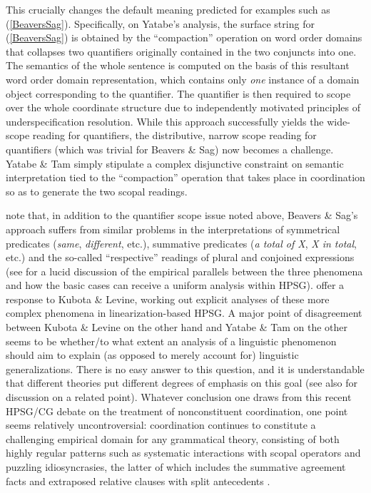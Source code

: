 \documentclass[output=paper
                ,modfonts
 	        ,biblatex
                ,babelshorthands
                ,newtxmath
                ,draftmode
                ,colorlinks, citecolor=brown
]{langscibook}
\begin{document}
This crucially changes the default meaning predicted for examples such
as (\ref{BeaversSag}). Specifically, on Yatabe's analysis, the surface
string for (\ref{BeaversSag}) is obtained by the ``compaction''
operation on word order domains that collapses two quantifiers
originally contained in the two conjuncts into one. The semantics of
the whole sentence is computed on the basis of this resultant word
order domain representation, which contains only \emph{one} instance
of a domain object corresponding to the quantifier. The quantifier is
then required to scope over the whole coordinate structure due to
independently motivated principles of underspecification resolution.
While this approach successfully yields the wide-scope reading for
quantifiers, the distributive, narrow scope reading for quantifiers
(which was trivial for Beavers \& Sag) now becomes a challenge.
Yatabe \& Tam simply stipulate a complex disjunctive constraint on semantic
interpretation tied to the ``compaction'' operation that takes place in
coordination so as to generate the two scopal readings.

\citet[Section~3.2.2]{kubota-levine-coord} note that, in addition to the quantifier
scope issue noted above, Beavers \& Sag's approach suffers from similar problems
in the interpretations of symmetrical predicates (\textit{same},
\textit{different}, etc.), summative predicates (\textit{a total of
X}, \textit{X in total}, etc.) and the so-called ``respective'' readings
of plural and conjoined expressions (see \citealt{chaves12} for a lucid
discussion of the empirical parallels between the three phenomena and
how the basic cases can receive a uniform analysis within HPSG).
\citet{yatabe-tam2017} offer a response to Kubota \& Levine, working out explicit
analyses of these more complex phenomena in linearization-based HPSG.
A major point of disagreement between Kubota \& Levine on the other
hand and Yatabe \& Tam on the other seems to be
whether/to what extent an analysis of a linguistic phenomenon
should aim to explain (as opposed to merely account for)
linguistic generalizations. There is no easy answer to this
question, and it is understandable that different theories put
different degrees of emphasis on this goal (see also
 for discussion on a related point).
Whatever conclusion one draws from this recent HPSG/CG debate on
the treatment of nonconstituent coordination, one point seems 
relatively uncontroversial: coordination continues to constitute a challenging
empirical domain for any grammatical theory,
consisting of both highly regular patterns such as systematic
interactions with scopal operators
\citep{kubota-levine-coord,KubotaLevineBook} and puzzling
idiosyncrasies, the latter of which includes the summative agreement
facts \citep{postalextraction,yatabe-tam2017} and extraposed relative
clauses with split antecedents
\citep{PerlmutterRoss70,yatabe-tam2017}.
\end{document}
